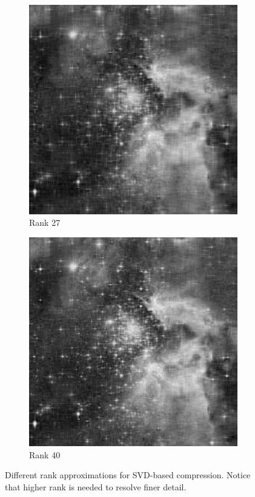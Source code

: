 \begin{figure}
\begin{subfigure}[b]{.35\textwidth}
\centering
\includegraphics[width=\textwidth]{rank27.jpg}
\caption{Rank 27}
\end{subfigure}
\begin{subfigure}[b]{.35\textwidth}
\centering
\includegraphics[width=\textwidth]{rank40.jpg}
\caption{Rank 40}
\end{subfigure}
\caption{Different rank approximations for SVD-based compression.  Notice that higher rank is needed to resolve finer detail.}
\label{fig:rankvalues}
\end{figure}

